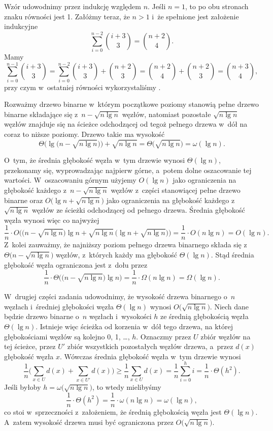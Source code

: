 
\exercise %
Wzór udowodnimy przez indukcję względem $n$.
Jeśli $n=1$, to po obu stronach znaku równości jest 1.
Załóżmy teraz, że $n>1$ i~że spełnione jest założenie indukcyjne
\[
	\sum_{i=0}^{n-2}\binom{i+3}{3} = \binom{n+2}{4}.
\]
Mamy
\[
	\sum_{i=0}^{n-1}\binom{i+3}{3} = \sum_{i=0}^{n-2}\binom{i+3}{3}+\binom{n+2}{3} = \binom{n+2}{4}+\binom{n+2}{3} = \binom{n+3}{4},
\]
przy czym w~ostatniej równości wykorzystaliśmy .

\exercise %
Rozważmy drzewo binarne w~którym początkowe poziomy stanowią pełne drzewo binarne składające się z~$n-\sqrt{n\lg n}$ węzłów, natomiast pozostałe $\sqrt{n\lg n}$ węzłów znajduje się na ścieżce odchodzącej od tegoż pełnego drzewa w~dół na coraz to niższe poziomy.
Drzewo takie ma wysokość
\[
	\Theta\bigl(\lg\bigl(n-\sqrt{n\lg n}\bigr)\bigr)+\sqrt{n\lg n} = \Theta\bigl(\!\sqrt{n\lg n}\bigr) = \omega(\lg n).
\]

O~tym, że średnia głębokość węzła w~tym drzewie wynosi $\Theta(\lg n)$, przekonamy się, wyprowadzając najpierw górne, a~potem dolne oszacowanie tej wartości.
W~oszacowaniu górnym użyjemy $O(\lg n)$ jako ograniczenia na głębokość każdego z~$n-\sqrt{n\lg n}$ węzłów z~części stanowiącej pełne drzewo binarne oraz $O\bigl(\lg n+\sqrt{n\lg n}\bigr)$ jako ograniczenia na głębokość każdego z~$\sqrt{n\lg n}$ węzłów ze ścieżki odchodzącej od pełnego drzewa.
Średnia głębokość węzła wynosi więc co najwyżej
\[
	\frac{1}{n}\cdot O\bigl(\bigl(n-\sqrt{n\lg n}\bigr)\lg n+\sqrt{n\lg n}\,\bigl(\lg n+\sqrt{n\lg n}\bigr)\bigr) = \frac{1}{n}\cdot O(n\lg n) = O(\lg n).
\]
Z~kolei zauważmy, że najniższy poziom pełnego drzewa binarnego składa się z~$\Theta\bigl(n-\sqrt{n\lg n}\bigr)$ węzłów, z~których każdy ma głębokość $\Theta(\lg n)$.
Stąd średnia głębokość węzła ograniczona jest z~dołu przez
\[
	\frac{1}{n}\cdot\Theta\bigl(\bigl(n-\sqrt{n\lg n}\bigr)\lg n\bigr) = \frac{1}{n}\cdot\Omega(n\lg n) = \Omega(\lg n).
\]

W~drugiej części zadania udowodnimy, że wysokość drzewa binarnego o~$n$ węzłach i~średniej głębokości węzła $\Theta(\lg n)$ wynosi $O\bigl(\!\sqrt{n\lg n}\bigr)$.
Niech dane będzie drzewo binarne o~$n$ węzłach i~wysokości $h$ ze średnią głębokością węzła $\Theta(\lg n)$.
Istnieje więc ścieżka od korzenia w~dół tego drzewa, na której głębokościami węzłów są kolejno 0, 1, \dots, $h$.
Oznaczmy przez $U$ zbiór węzłów na tej ścieżce, przez $U'$ zbiór wszystkich pozostałych węzłów drzewa, a~przez $d(x)$ głębokość węzła $x$.
Wówczas średnia głębokość węzła w~tym drzewie wynosi
\[
	\frac{1}{n}\biggl(\sum_{x\in U}d(x)+\sum_{x\in U'}d(x)\biggr) \ge \frac{1}{n}\sum_{x\in U}d(x) = \frac{1}{n}\sum_{i=0}^hi = \frac{1}{n}\cdot\Theta(h^2).
\]
Jeśli byłoby $h=\omega\bigl(\!\sqrt{n\lg n}\bigr)$, to wtedy mielibyśmy
\[
	\frac{1}{n}\cdot\Theta(h^2) = \frac{1}{n}\cdot\omega(n\lg n) = \omega(\lg n),
\]
co stoi w~sprzeczności z~założeniem, że średnią głębokością węzła jest $\Theta(\lg n)$.
A~zatem wysokość drzewa musi być ograniczona przez $O\bigl(\!\sqrt{n\lg n}\bigr)$.

